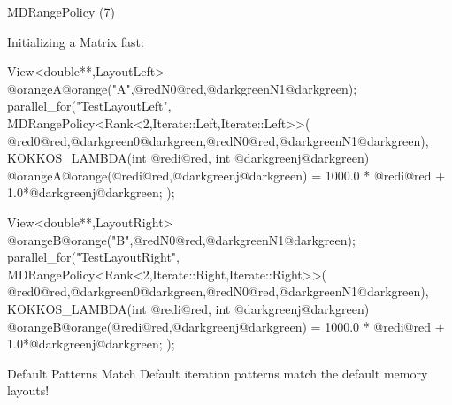 
\begin{frame}[fragile]{MDRangePolicy (7)}

  Initializing a Matrix fast:

\begin{code}[keywords={LayoutLeft,Iterate,Left}]
View<double**,LayoutLeft> @orangeA@orange("A",@redN0@red,@darkgreenN1@darkgreen);
parallel_for("TestLayoutLeft",
  MDRangePolicy<Rank<2,Iterate::Left,Iterate::Left>>(
	{@red0@red,@darkgreen0@darkgreen},{@redN0@red,@darkgreenN1@darkgreen}),
  KOKKOS_LAMBDA(int @redi@red, int @darkgreenj@darkgreen) {
    @orangeA@orange(@redi@red,@darkgreenj@darkgreen) = 1000.0 * @redi@red + 1.0*@darkgreenj@darkgreen;
});
\end{code}

\begin{code}[keywords={LayoutRight,Iterate,Right}]
View<double**,LayoutRight> @orangeB@orange("B",@redN0@red,@darkgreenN1@darkgreen);
parallel_for("TestLayoutRight",
  MDRangePolicy<Rank<2,Iterate::Right,Iterate::Right>>(
	{@red0@red,@darkgreen0@darkgreen},{@redN0@red,@darkgreenN1@darkgreen}),
  KOKKOS_LAMBDA(int @redi@red, int @darkgreenj@darkgreen) {
    @orangeB@orange(@redi@red,@darkgreenj@darkgreen) = 1000.0 * @redi@red + 1.0*@darkgreenj@darkgreen;
});
\end{code}

\pause

	\begin{block}{Default Patterns Match}
Default iteration patterns match the default memory layouts!
	\end{block}
\end{frame}




